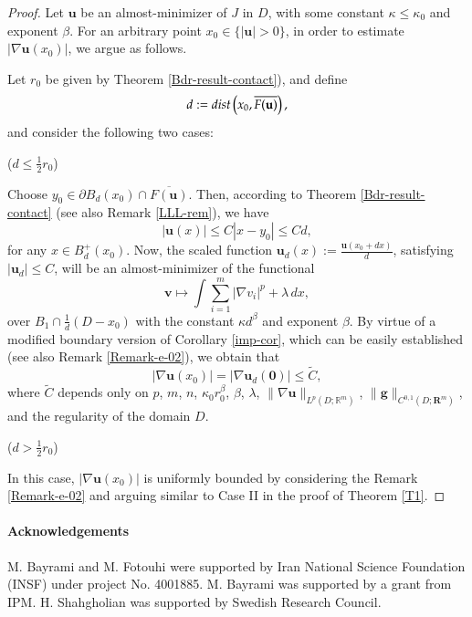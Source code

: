 \documentclass{amsart}
\newcommand{\dist}{{\rm dist}}
\begin{document}
\begin{proof}
Let $\mathbf{u}$ be an almost-minimizer of $J$ in $D$, with some constant $\kappa\le \kappa_0$ and exponent $\beta$.
For an arbitrary point $x_0 \in \{ |\mathbf{u}|>0 \}$, in order to estimate $|\nabla \mathbf{u}(x_0)|$, we argue as follows.


\medskip

Let   $r_0$ be given by Theorem \ref{Bdr-result-contact}),
and define 
$$d:=\dist \left(x_0, \overline{F(\mathbf{u})}\right),$$
and consider the following two cases:


\medskip


 ($d\le \frac{1}{2}r_0$)



\noindent
Choose $y_0 \in \partial B_d(x_0)\cap \overline{F(\mathbf{u})}$. Then, according to Theorem \ref{Bdr-result-contact} (see also Remark \ref{LLL-rem}), we have
$$ |\mathbf{u}(x)| \leq C |x-y_0| \leq Cd, $$
for any $x\in B_{d}^+(x_0)$.
Now, the scaled function $\mathbf{u}_d(x):=\frac{\mathbf{u}(x_0+dx)}{d}$, satisfying $|\mathbf{u}_d|\le C$, will be an almost-minimizer of the functional
$$ \mathbf{v} \mapsto \int \sum_{i=1}^{m} |\nabla v_i|^p + \lambda \, dx, $$
over $B_1 \cap \frac1d (D-x_0)$
with the constant $\kappa d^{\beta}$ and exponent $\beta$. 
By virtue of a modified boundary version of Corollary \ref{imp-cor}, which can be easily established (see also Remark \ref{Remark-e-02}), we obtain that 
$$
|\nabla \mathbf{u}(x_0)|=|\nabla \mathbf{u}_d(\mathbf{0})| \le \tilde C,
$$
where $\tilde C$ depends only on $p$, $m$, $n$, $\kappa_0 r_0^{\beta}$, $\beta$, $\lambda$, $\| \nabla \mathbf{u} \|_{L^p(D; \mathbb{R}^m)}$, $\|\mathbf{g}\|_{C^{0,1}(D;\mathbf{R}^m)}$, and the regularity of the domain $D$.

\medskip

 {($d > \frac{1}{2}r_0$)}



\noindent
In this case, $|\nabla \mathbf{u}(x_0)|$ is uniformly bounded by considering the Remark \ref{Remark-e-02} and arguing similar to Case II in the proof of Theorem \ref{T1}.
\end{proof}









\medskip


\paragraph{\bf{Acknowledgements}}
M. Bayrami and M. Fotouhi were supported by Iran National Science Foundation (INSF) under project No. 4001885. M. Bayrami was supported by a grant from IPM. H. Shahgholian was supported by Swedish Research Council.
\end{document}
